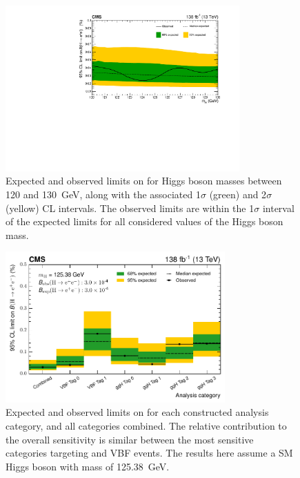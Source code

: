 \begin{figure}[htbp!]
\centering
\includegraphics[width=0.8\textwidth]{Figures/Hee/Results/limits/limitVsMh_paper.pdf}\hfill%
\caption[Limits on \BHee as a function of the Higgs boson mass.]{Expected and observed limits on \BHee for Higgs boson masses between 120 and 130~GeV, along with the associated 1$\sigma$ (green) and 2$\sigma$ (yellow) CL intervals. The observed limits are within the 1$\sigma$ interval of the expected limits for all considered values of the Higgs boson mass.}
\label{fig:hee_limits}
\end{figure}


\begin{figure}[htbp!]
\centering
\includegraphics[width=0.75\textwidth]{Figures/Hee/Results/limits/per_category_limits_paper.pdf}\hfill%
\caption[Limits on \BHee per analysis category.]{Expected and observed limits on \BHee for each constructed analysis category, and all categories combined. The relative contribution to the overall sensitivity is similar between the most sensitive categories targeting \ggH and VBF events. The results here assume a SM Higgs boson with mass of 125.38~GeV. }
\label{fig:hee_limits_per_cat}
\end{figure}

